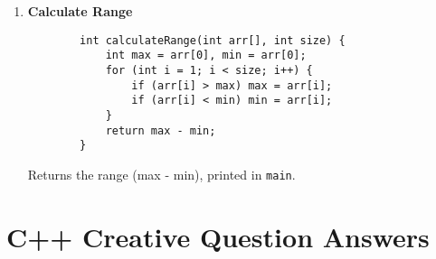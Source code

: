 \documentclass[a4paper,12pt]{article}
\begin{document}
\begin{enumerate}
    \lstset{language=C}
    \begin{lstlisting}
        void findDuplicates(int arr[], int size) {
            int found = 0;
            for (int i = 0; i < size; i++) {
                for (int j = i + 1; j < size; j++) {
                    if (arr[i] == arr[j]) {
                        printf("Duplicate found: %d\n", arr[i]);
                        found = 1;
                    }
                }
            }
            if (!found) printf("No duplicates found\n");
        }
    \end{lstlisting}

    Checks for duplicates and prints them; called in \verb|main|.

    \item \textbf{Calculate Range}

    \lstset{language=C}
    \begin{lstlisting}
        int calculateRange(int arr[], int size) {
            int max = arr[0], min = arr[0];
            for (int i = 1; i < size; i++) {
                if (arr[i] > max) max = arr[i];
                if (arr[i] < min) min = arr[i];
            }
            return max - min;
        }
    \end{lstlisting}

    Returns the range (max - min), printed in \verb|main|.
\end{enumerate}

\section{C++ Creative Question Answers}
\end{document}
